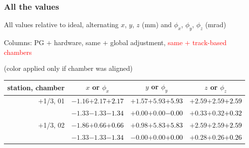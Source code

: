 \documentclass[compress]{beamer}
\begin{document}
\begin{frame}
\frametitle{All the values}
\tiny

All values relative to ideal, alternating $x$, $y$, $z$ (mm) and $\phi_x$, $\phi_y$, $\phi_z$ (mrad)

Columns: PG $+$ hardware, same $+$ global adjustment, \textcolor{red}{same $+$ track-based chambers}

\hfill (color applied only if chamber was aligned)

\vfill
\renewcommand{\arraystretch}{1.1}
\begin{tabular}{r | c | c | c}
station, chamber & $x$ or $\phi_x$ & $y$ or $\phi_y$ & $z$ or $\phi_z$ \\\hline
$+$1/3, 01 & $-1.16$\hspace{0.1 cm}$+2.17$\hspace{0.1 cm}\textcolor{black}{$+2.17$} & $+1.57$\hspace{0.1 cm}$+5.93$\hspace{0.1 cm}\textcolor{black}{$+5.93$} & $+2.59$\hspace{0.1 cm}$+2.59$\hspace{0.1 cm}\textcolor{black}{$+2.59$} \\
           & $-1.33$\hspace{0.1 cm}$-1.33$\hspace{0.1 cm}\textcolor{black}{$-1.34$} & $+0.00$\hspace{0.1 cm}$+0.00$\hspace{0.1 cm}\textcolor{black}{$-0.00$} & $+0.33$\hspace{0.1 cm}$+0.32$\hspace{0.1 cm}\textcolor{black}{$+0.32$} \\
$+$1/3, 02 & $-1.86$\hspace{0.1 cm}$+0.66$\hspace{0.1 cm}\textcolor{black}{$+0.66$} & $+0.98$\hspace{0.1 cm}$+5.83$\hspace{0.1 cm}\textcolor{black}{$+5.83$} & $+2.59$\hspace{0.1 cm}$+2.59$\hspace{0.1 cm}\textcolor{black}{$+2.59$} \\
           & $-1.33$\hspace{0.1 cm}$-1.33$\hspace{0.1 cm}\textcolor{black}{$-1.34$} & $-0.00$\hspace{0.1 cm}$+0.00$\hspace{0.1 cm}\textcolor{black}{$+0.00$} & $+0.28$\hspace{0.1 cm}$+0.26$\hspace{0.1 cm}\textcolor{black}{$+0.26$} \\

\end{tabular}
\end{frame}
\end{document}
